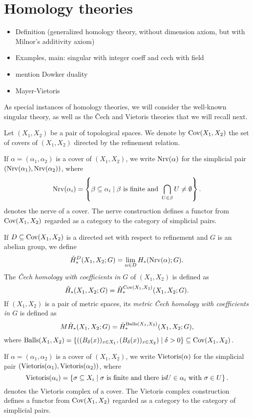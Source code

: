 
\section{Homology theories} \label{s:homology}

\begin{itemize}
\item Definition (generalized homology theory, without dimension axiom, but with Milnor's additivity axiom)
\item Examples, main: singular with integer coeff and cech with field \cite{Kelly.1961}
\item mention Dowker duality
\item Mayer-Vietoris
\end{itemize}
As special instances of homology theories, we will consider the well-known singular theory, as well as the \v{C}ech and Vietoris theories that we will recall next.

Let $(X_{1},X_{2})$ be a pair of topological spaces. We denote by $\operatorname{Cov}(X_{1},X_{2})$ the set of covers of $(X_{1},X_{2})$ directed by the refinement relation. 

If $\alpha=(\alpha_{1},\alpha_{2})$ is a cover of $(X_{1},X_{2})$, we write $\operatorname{Nrv}(\alpha)$ for the simplicial pair $(\operatorname{Nrv}(\alpha_{1}),\operatorname{Nrv}(\alpha_{2}))$, where 
\[
\operatorname{Nrv}(\alpha_{i})=\left\{\beta\subseteq\alpha_{i}\mid\beta\text{ is finite and }\bigcap_{U\in\beta} U\neq\emptyset\right\}.
\]
denotes the nerve of a cover. The nerve construction defines a functor from $\operatorname{Cov}(X_{1},X_{2})$ regarded as a category to the category of simplicial pairs. 

If $D\subseteq\operatorname{Cov}(X_{1},X_{2})$ is a directed set with respect to refinement and $G$ is an abelian group, we define
\[
\check{H}_{*}^{D}(X_{1},X_{2};G)=\lim_{\alpha\in D}H_{*}(\operatorname{Nrv}(\alpha);G).
\]
The \emph{\v{C}ech homology with coefficients in $G$} of $(X_{1},X_{2})$ is defined as
\[
\CH_{*}(X_{1},X_{2};G)=\CH_{*}^{\Cov(X_{1},X_{2})}(X_{1},X_{2};G).%
\]
If $(X_{1},X_{2})$ is a pair of metric spaces, its \emph{metric \v{C}ech homology with coefficients in $G$} is defined as
\[
\MCH_{*}(X_{1},X_{2};G)=\CH_{*}^{\Balls(X_{1},X_{2})}(X_{1},X_{2};G),%
\]
where $\operatorname{Balls}(X_{1},X_{2})=\{((B_{\delta}(x))_{x\in X_{1}},(B_{\delta}(x))_{x\in X_{2}})\mid\delta>0\}\subseteq\operatorname{Cov}(X_{1},X_{2})$.

If $\alpha=(\alpha_{1},\alpha_{2})$ is a cover of $(X_{1},X_{2})$, we write $\operatorname{Vietoris}(\alpha)$ for the simplicial pair $(\operatorname{Vietoris}(\alpha_{1}),\operatorname{Vietoris}(\alpha_{2}))$, where 
\[
\operatorname{Vietoris}(\alpha_{i})=\left\{\sigma\subseteq X_{i}\mid\sigma\text{ is finite and there is}U\in\alpha_{i}\text{ with }\sigma\in U\right\}.
\]
denotes the Vietoris complex of a cover. The Vietoris complex construction defines a functor from $\operatorname{Cov}(X_{1},X_{2})$ regarded as a category to the category of simplicial pairs. 

